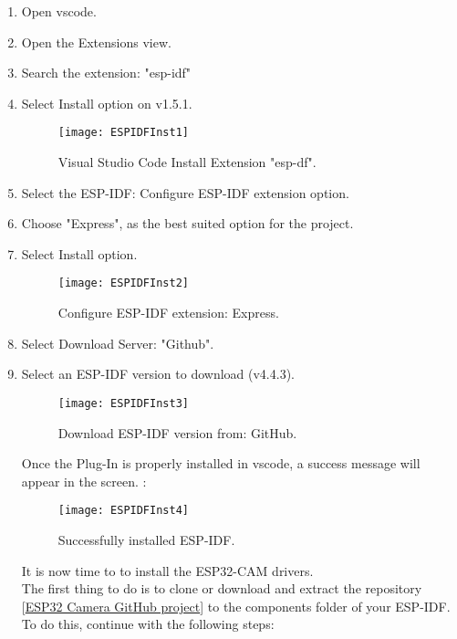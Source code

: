 \begin{enumerate}
	\item Open \ac{vscode}.
	\item Open the Extensions view.
	\item Search the extension: "esp-idf"
	\item Select Install option on v1.5.1.
		\begin{figure}  [H]
		\begin{center}
			\texttt{[image: ESPIDFInst1]}
			\caption{Visual Studio Code Install Extension "esp-df".} 
			\label{fig:Visual Studio Code Install Extension "esp-df".}
		\end{center}
	\end{figure}
	\item Select the ESP-IDF: Configure ESP-IDF extension option.
	\item Choose "Express", as the best suited option for the project.
	\item Select Install option.
	\begin{figure}  [H]
	\begin{center}
		\texttt{[image: ESPIDFInst2]}
		\caption{Configure ESP-IDF extension: Express.} 
		\label{fig:Configure ESP-IDF extension: Express.}
	\end{center}
	\end{figure}
	\item Select Download Server: "Github".	
	\item Select an ESP-IDF version to download (v4.4.3).
	\begin{figure}  [H]
	\begin{center}
		\texttt{[image: ESPIDFInst3]}
		\caption{Download ESP-IDF version from: GitHub.} 
		\label{fig:Download ESP-IDF version from: GitHub.}
	\end{center}
	\end{figure}	
	Once the Plug-In is properly installed in \ac{vscode}, a success message will appear in the screen. \autocite{Ignacio:2022}:
		\begin{figure}  [H]
		\begin{center}
			\texttt{[image: ESPIDFInst4]}
			\caption{Successfully installed ESP-IDF.} 
			\label{fig:Successfully installed ESP-IDF.}
		\end{center}
	\end{figure}	
	It is now time to to install the ESP32-CAM drivers. \\
	The first thing to do is to clone or download and extract the repository [\href{https://github.com/espressif/esp32-camera}{ESP32 Camera GitHub project}] to the components folder of your ESP-IDF. To do this, continue with the following steps:

\end{enumerate}
